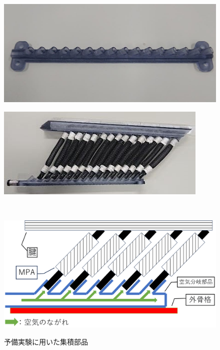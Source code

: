 \begin{figure}[t]
  \begin{minipage}{0.5\hsize}
    \centering
    \includegraphics[scale=0.22]{image/airtube_yobi.jpg}
    \label{fig:pairtube}
  \end{minipage}
  \begin{minipage}{0.5\hsize}
    \centering  
    \includegraphics[scale=0.75]{image/yobi_syuseki.JPG}
    \label{fig:psyuseki}
  \end{minipage}\\

  \begin{minipage}{1\hsize}
    \vspace{3mm}
    \centering
    \includegraphics[scale=0.06]{image/air_moshiki.png}
    \label{fig:pmoshiki}
  \end{minipage}
  \caption{予備実験に用いた集積部品}
  \label{fig:yobisyuseki}
\end{figure}
